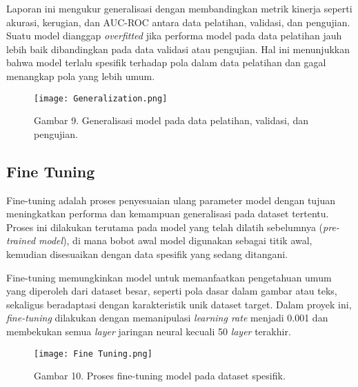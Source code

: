 \documentclass[12pt,a4paper]{article}
\begin{document}
Laporan ini mengukur generalisasi dengan membandingkan metrik kinerja seperti akurasi, kerugian, dan AUC-ROC antara data pelatihan, validasi, dan pengujian. Suatu model dianggap \textit{overfitted} jika performa model pada data pelatihan jauh lebih baik dibandingkan pada data validasi atau pengujian. Hal ini menunjukkan bahwa model terlalu spesifik terhadap pola dalam data pelatihan dan gagal menangkap pola yang lebih umum.

\begin{figure}[h]
    \captionsetup{labelformat=empty}
    \centering
    \texttt{[image: Generalization.png]} %
    \caption{Gambar 9. Generalisasi model pada data pelatihan, validasi, dan pengujian.}
    \label{fig:generalization}
\end{figure}
\subsection{Fine Tuning}
Fine-tuning adalah proses penyesuaian ulang parameter model dengan tujuan meningkatkan performa dan kemampuan generalisasi pada dataset tertentu. Proses ini dilakukan terutama pada model yang telah dilatih sebelumnya (\textit{pre-trained model}), di mana bobot awal model digunakan sebagai titik awal, kemudian disesuaikan dengan data spesifik yang sedang ditangani. 

Fine-tuning memungkinkan model untuk memanfaatkan pengetahuan umum yang diperoleh dari dataset besar, seperti pola dasar dalam gambar atau teks, sekaligus beradaptasi dengan karakteristik unik dataset target. Dalam proyek ini, \textit{fine-tuning} dilakukan dengan memanipulasi \textit{learning rate} menjadi 0.001 dan membekukan semua \textit{layer} jaringan neural kecuali 50 \textit{layer} terakhir.

\begin{figure}[h]
    \captionsetup{labelformat=empty} 
    \centering
    \texttt{[image: Fine Tuning.png]} %
    \caption{Gambar 10. Proses fine-tuning model pada dataset spesifik.}
    \label{fig:fine_tuning}
\end{figure}
\end{document}
